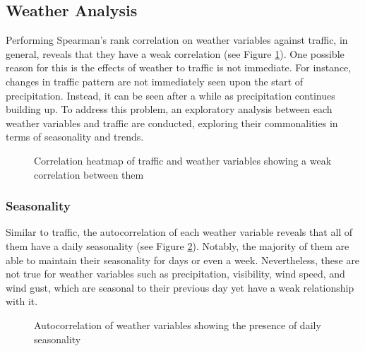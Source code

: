\subsection{Weather Analysis}

Performing Spearman's rank correlation on weather variables against traffic, in general, reveals that they have a weak correlation (see Figure \ref{figure_corr_trafficweather}). One possible reason for this is the effects of weather to traffic is not immediate. For instance, changes in traffic pattern are not immediately seen upon the start of precipitation. Instead, it can be seen after a while as precipitation continues building up. To address this problem, an exploratory analysis between each weather variables and traffic are conducted, exploring their commonalities in terms of seasonality and trends.


\begin{figure}[h]
  \centering
  \captionsetup{justification=centering}
  \caption{Correlation heatmap of traffic and weather variables showing a weak correlation between them}
\label{figure_corr_trafficweather}
\end{figure}



\subsubsection{Seasonality}

Similar to traffic, the autocorrelation of each weather variable reveals that all of them have a daily seasonality (see Figure \ref{figure_autocorr_weather}). Notably, the majority of them are able to maintain their seasonality for days or even a week. Nevertheless, these are not true for weather variables such as precipitation, visibility, wind speed, and wind gust, which are seasonal to their previous day yet have a weak relationship with it.


\begin{figure}[h]
  \centering
  \captionsetup{justification=centering}
  \caption{Autocorrelation of weather variables showing the presence of daily seasonality}
\label{figure_autocorr_weather}
\end{figure}


